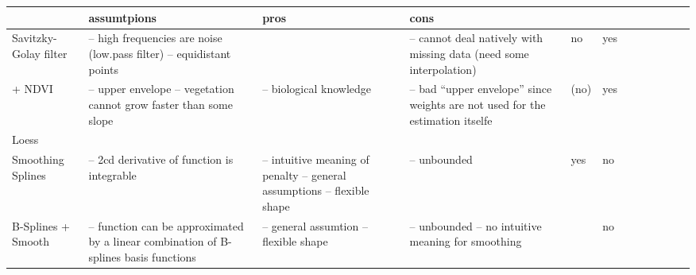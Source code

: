 \begin{table}[!ht]
    \centering
    \begin{tabular}{p{1.6cm}p{3.3cm}p{3.3cm}p{3.3cm}p{0.4cm}p{0.4cm}p{3cm}p{3cm}p{3cm}p{3cm}p{3cm}p{3cm}|}
    ~ &
	\textbf{assumtpions} &
	\textbf{pros} &
	\textbf{cons} &
	\rotatebox{90}{weights} &
	\rotatebox{90}{bounded} \\ \hline
    
    Savitzky-Golay filter &
	-- high frequencies are noise (low.pass filter) -- equidistant points &
	~ &
	-- cannot deal natively with missing data (need some interpolation) &
	no &
	yes \\ \hline%
    
    + NDVI &
	-- upper envelope -- vegetation cannot grow faster than some slope &
	-- biological knowledge  &
	-- bad ``upper envelope'' since weights are not used for the estimation itselfe &
	(no) &
	yes \\ \hline%

    Loess &
	~ &
	~ &
	~ &
	~ &
	~ \\ \hline%
    
    Smoothing Splines &
	-- 2cd derivative of function is integrable &
	-- intuitive meaning of penalty -- general assumptions -- flexible shape &
	-- unbounded &
	yes &
	no \\ \hline%
    
    B-Splines + Smooth &
	-- function can be approximated by a linear combination of B-splines basis functions &
	-- general assumtion -- flexible shape &
	-- unbounded -- no intuitive meaning for smoothing &
	~ &
	no \\ \hline%

	    
    

\end{tabular}
\end{table}
